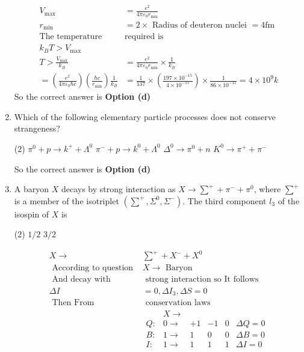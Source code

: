 \begin{enumerate}
\begin{answer}
$$\begin{aligned}
	V_{\max }&=\frac{e^2}{4 \pi \varepsilon_0 r_{\min }}\\
	r_{\min }&=2 \times\text{ Radius of deuteron nuclei }=4 \mathrm{fm}\\
	\text{The temperature }&\text{required is}\\
	k_B T>V_{\max }& \\
	T>\frac{V_{\max }}{k_B}&=\frac{e^2}{4 \pi \varepsilon_0 r_{\min }} \times \frac{1}{k_B} \\
	=\left(\frac{e^2}{4 \pi \varepsilon_0 \hbar c}\right)\left(\frac{\hbar c}{r_{\min }}\right) \frac{1}{k_B}&=\frac{1}{137} \times\left(\frac{197 \times 10^{-15}}{4 \times 10^{-15}}\right) \times \frac{1}{86 \times 10^{-11}}=4 \times 10^9 k
\end{aligned}
$$
So the correct answer is \textbf{Option (d)}
\end{answer}
	\item Which of the following elementary particle processes does not conserve strangeness?
 \begin{tasks}(2)
	\task[\textbf{a.}]$\pi^0+p \rightarrow k^{+}+\Lambda^0$
	\task[\textbf{b.}]$\pi^{-}+p \rightarrow k^0+\Lambda^0$
	\task[\textbf{c.}]$\Delta^0 \rightarrow \pi^0+n$
	\task[\textbf{d.}] $K^0 \rightarrow \pi^{+}+\pi^{-}$	
\end{tasks}
\begin{answer}
So the correct answer is \textbf{Option (d)}
\end{answer}
	\item A baryon $X$ decays by strong interaction as $X \rightarrow \sum^{+}+\pi^{-}+\pi^0$, where $\sum^{+}$ is a member of the isotriplet $\left(\sum^{+}, \Sigma^0, \Sigma^{-}\right)$. The third component $l_3$ of the isospin of $X$ is
 \begin{tasks}(2)
	\task[\textbf{b.}] $1 / 2$
	\task[\textbf{d.}]  $3 / 2$
\end{tasks}
\begin{answer}
	$$
	\begin{aligned}
	X \rightarrow& \sum^{+}+X^{-}+X^0\\
	\text { According to question } &X \rightarrow \text { Baryon }\\
\text { And decay with }&\text{ strong interaction so It follows}\\
\Delta I&=0, \Delta I_3, \Delta S=0\\
\text { Then From }&\text{ conservation laws}\\
&\begin{array}{llllll} & X \rightarrow & & & & \\ Q: & 0 \rightarrow & +1 & -1 & 0 & \Delta Q=0 \\ B: & 1 \rightarrow & 1 & 0 & 0 & \Delta B=0 \\ I: & 1 \rightarrow & 1 & 1 & 1 & \Delta I=0\end{array}\\

\end{aligned}$$
\end{answer}
\end{enumerate}
